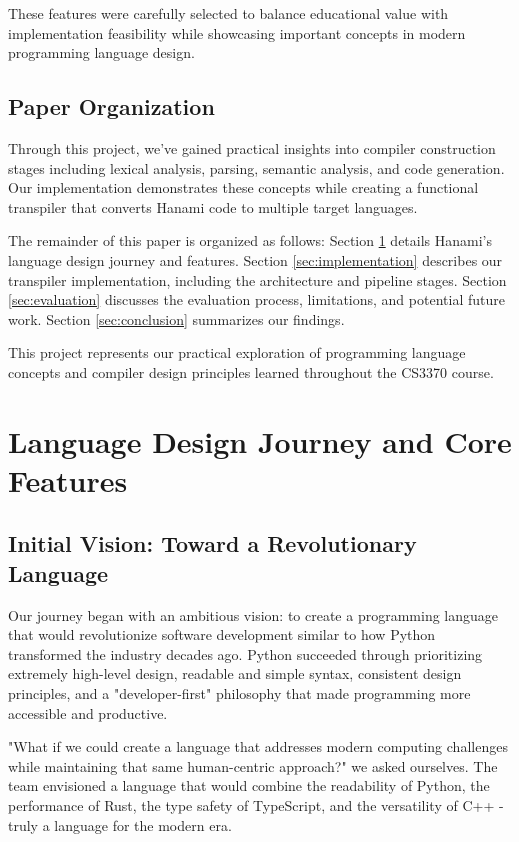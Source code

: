 \documentclass[conference]{IEEEtran}
\begin{document}
These features were carefully selected to balance educational value with implementation feasibility while showcasing important concepts in modern programming language design.

\subsection{Paper Organization}

Through this project, we've gained practical insights into compiler construction stages including lexical analysis, parsing, semantic analysis, and code generation. Our implementation demonstrates these concepts while creating a functional transpiler that converts Hanami code to multiple target languages.

The remainder of this paper is organized as follows: Section \ref{sec:design} details Hanami's language design journey and features. Section \ref{sec:implementation} describes our transpiler implementation, including the architecture and pipeline stages. Section \ref{sec:evaluation} discusses the evaluation process, limitations, and potential future work. Section \ref{sec:conclusion} summarizes our findings. %

This project represents our practical exploration of programming language concepts and compiler design principles learned throughout the CS3370 course.


\section{Language Design Journey and Core Features}
\label{sec:design}

\subsection{Initial Vision: Toward a Revolutionary Language}
Our journey began with an ambitious vision: to create a programming language that would revolutionize software development similar to how Python transformed the industry decades ago. Python succeeded through prioritizing extremely high-level design, readable and simple syntax, consistent design principles, and a "developer-first" philosophy that made programming more accessible and productive.

"What if we could create a language that addresses modern computing challenges while maintaining that same human-centric approach?" we asked ourselves. The team envisioned a language that would combine the readability of Python, the performance of Rust, the type safety of TypeScript, and the versatility of C++ - truly a language for the modern era.
\end{document}
